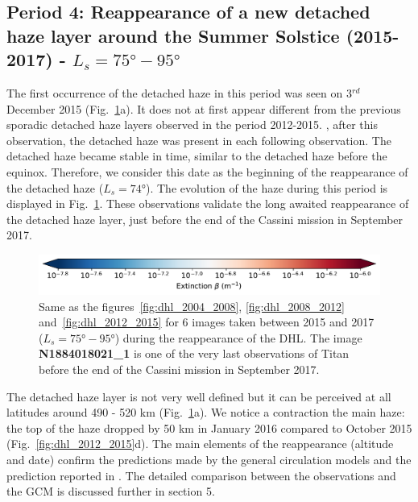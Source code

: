 \subsection{Period 4: Reappearance of a new  detached haze layer around the Summer Solstice (2015-2017) - $L_s=\ang{75}-\ang{95}$}

The first occurrence of the  detached haze in this period was seen on 3$^{rd}$ December 2015
(Fig.~\ref{fig:dhl_2015_2017}a). It
does not at first appear different from the previous sporadic detached haze layers observed in the period 2012-2015. , after
this observation, the detached haze was  present in each following observation. The detached haze became stable in time,
similar to the detached haze before the equinox. Therefore, we consider this date as  the beginning of the
reappearance of the detached haze ($L_s=\ang{74}$). The evolution of the haze during this period is displayed in
Fig.~\ref{fig:dhl_2015_2017}. These observations validate the long awaited reappearance of the detached haze layer,
just before the end of the Cassini mission in September 2017.

\begin{figure}[!ht]
\includegraphics[width=.5\textwidth]{Fig/Extinction_colorbar}
\caption{Same as the figures~\ref{fig:dhl_2004_2008}, \ref{fig:dhl_2008_2012}
and~\ref{fig:dhl_2012_2015} for 6 images taken between 2015 and 2017
($L_s=\ang{75}-\ang{95}$) during the reappearance of the DHL.
The image \textbf{N1884018021\_1} is one of the very last observations of Titan before
the end of the Cassini mission in September 2017.}
\label{fig:dhl_2015_2017}
\end{figure}

The detached haze layer is not very well defined but it can be perceived at all latitudes
around 490 - 520 km (Fig.~\ref{fig:dhl_2015_2017}a). We notice a contraction
the main haze: the top of the haze dropped by 50 km in January 2016 compared to October 2015
(Fig.~\ref{fig:dhl_2012_2015}d). The main elements of the reappearance (altitude and date) confirm the
predictions made by the general circulation models \citep{Lebonnois2012,Larson2015} and the prediction
reported in \cite{West2011}. The detailed comparison between the observations and the GCM is discussed further
in section 5.

